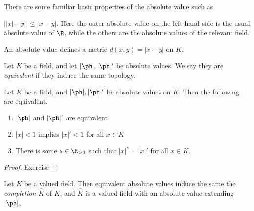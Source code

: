 \documentclass[a4paper]{article}
\begin{document}
There are some familiar basic properties of the absolute value such as
\begin{prop}
  $||x| - |y|| \leq |x - y|$. Here the outer absolute value on the left hand side is the usual absolute value of $\R$, while the others are the absolute values of the relevant field.
\end{prop}

An absolute value defines a metric $d(x, y) = |x - y|$ on $K$.

\begin{defi}
  Let $K$ be a field, and let $|\ph|, |\ph|'$ be absolute values. We say they are \emph{equivalent} if they induce the same topology.
\end{defi}

\begin{prop}
  Let $K$ be a field, and $|\ph|, |\ph|'$ be absolute values on $K$. Then the following are equivalent.
  \begin{enumerate}
    \item $|\ph|$ and $|\ph|'$ are equivalent
    \item $|x| < 1$ implies $|x|' < 1$ for all $x \in K$
    \item There is some $s \in \R_{> 0}$ such that $|x|^s = |x|'$ for all $x \in K$.
  \end{enumerate}
\end{prop}

\begin{proof}\leavevmode
%
  Exercise
\end{proof}

\begin{ex}
  Let $K$ be a valued field. Then equivalent absolute values induce the same the \emph{completion} $\hat{K}$ of $K$, and $\hat{K}$ is a valued field with an absolute value extending $|\ph|$.
\end{ex}
\end{document}
